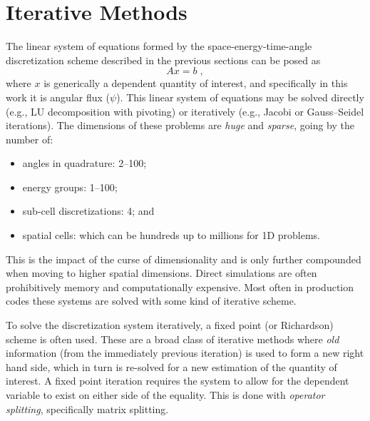 \section{Iterative Methods}

The linear system of equations formed by the space-energy-time-angle discretization scheme described in the previous sections can be posed as
\begin{equation}
\label{eq:introaxb}
    {A}x=b \; ,
\end{equation}
where $x$ is generically a dependent quantity of interest, and specifically in this work it is angular flux ($\psi$). 
This linear system of equations may be solved directly (e.g., LU decomposition with pivoting) or iteratively (e.g., Jacobi or Gauss--Seidel iterations).
The dimensions of these problems are \emph{huge} and \emph{sparse}, going by the number of:
\begin{itemize}
    \item angles in quadrature: \num{2}--\num{100};
    \item energy groups: \num{1}--\num{100};
    \item sub-cell discretizations: 4; and
    \item spatial cells: which can be hundreds up to millions for 1D problems.
\end{itemize}
This is the impact of the curse of dimensionality and is only further compounded when moving to higher spatial dimensions. 
Direct simulations are often prohibitively memory and computationally expensive.
Most often in production codes these systems are solved with some kind of iterative scheme.

To solve the discretization system iteratively, a fixed point (or Richardson) scheme is often used.
These are a broad class of iterative methods where \emph{old} information (from the immediately previous iteration) is used to form a new right hand side, which in turn is re-solved for a new estimation of the quantity of interest.
A fixed point iteration requires the system to allow for the dependent variable to exist on either side of the equality.
This is done with \emph{operator splitting}, specifically matrix splitting.

